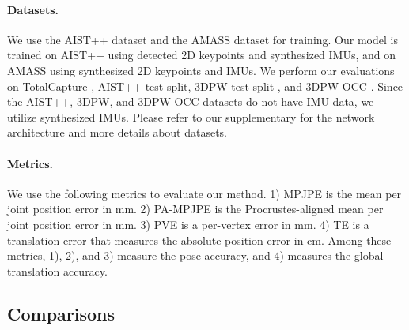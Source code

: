 \documentclass[sigconf,nonacm=true]{acmart}
\begin{document}
\paragraph{Datasets.}
We use the AIST++ dataset \cite{AIST++} and the AMASS dataset \cite{AMASS} for training.
Our model is trained on AIST++ using detected 2D keypoints and synthesized IMUs, and on AMASS using synthesized 2D keypoints and IMUs.
We perform our evaluations on TotalCapture \cite{TotalCapture}, AIST++ test split, 3DPW test split \cite{VIP}, and 3DPW-OCC \cite{VIP, ooh2020}.
Since the AIST++, 3DPW, and 3DPW-OCC datasets do not have IMU data, we utilize synthesized IMUs.
Please refer to our supplementary for the network architecture and more details about datasets.

\paragraph{Metrics.}
We use the following metrics to evaluate our method.
1) MPJPE is the mean per joint position error in mm.
2) PA-MPJPE is the Procrustes-aligned mean per joint position error in mm.
3) PVE is a per-vertex error in mm.
4) TE is a translation error that measures the absolute position error in cm.
Among these metrics, 1), 2), and 3) measure the pose accuracy, and 4) measures the global translation accuracy.
\subsection{Comparisons}\label{sec:comparisons}
\end{document}
